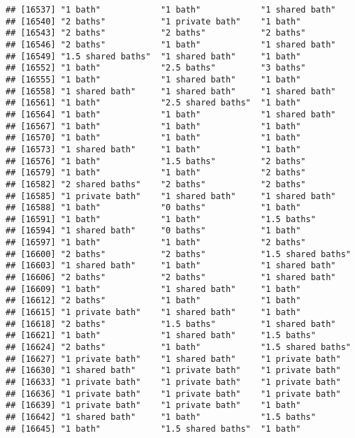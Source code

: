 \documentclass[
]{article}
\begin{document}
\begin{verbatim}
## [16537] "1 bath"            "1 bath"            "1 shared bath"    
## [16540] "2 baths"           "1 private bath"    "1 bath"           
## [16543] "2 baths"           "2 baths"           "2 baths"          
## [16546] "2 baths"           "1 bath"            "1 shared bath"    
## [16549] "1.5 shared baths"  "1 shared bath"     "1 bath"           
## [16552] "1 bath"            "2.5 baths"         "3 baths"          
## [16555] "1 bath"            "1 shared bath"     "1 bath"           
## [16558] "1 shared bath"     "1 shared bath"     "1 shared bath"    
## [16561] "1 bath"            "2.5 shared baths"  "1 bath"           
## [16564] "1 bath"            "1 bath"            "1 shared bath"    
## [16567] "1 bath"            "1 bath"            "1 bath"           
## [16570] "1 bath"            "1 bath"            "1 bath"           
## [16573] "1 shared bath"     "1 bath"            "1 bath"           
## [16576] "1 bath"            "1.5 baths"         "2 baths"          
## [16579] "1 bath"            "1 bath"            "2 baths"          
## [16582] "2 shared baths"    "2 baths"           "2 baths"          
## [16585] "1 private bath"    "1 shared bath"     "1 shared bath"    
## [16588] "1 bath"            "0 baths"           "1 bath"           
## [16591] "1 bath"            "1 bath"            "1.5 baths"        
## [16594] "1 shared bath"     "0 baths"           "1 bath"           
## [16597] "1 bath"            "1 bath"            "2 baths"          
## [16600] "2 baths"           "2 baths"           "1.5 shared baths" 
## [16603] "1 shared bath"     "1 bath"            "1 shared bath"    
## [16606] "2 baths"           "2 baths"           "1 shared bath"    
## [16609] "1 bath"            "1 shared bath"     "1 bath"           
## [16612] "2 baths"           "1 bath"            "1 bath"           
## [16615] "1 private bath"    "1 shared bath"     "1 bath"           
## [16618] "2 baths"           "1.5 baths"         "1 shared bath"    
## [16621] "1 bath"            "1 shared bath"     "1.5 baths"        
## [16624] "2 baths"           "1 bath"            "1.5 shared baths" 
## [16627] "1 private bath"    "1 shared bath"     "1 private bath"   
## [16630] "1 shared bath"     "1 private bath"    "1 private bath"   
## [16633] "1 private bath"    "1 private bath"    "1 private bath"   
## [16636] "1 private bath"    "1 private bath"    "1 private bath"   
## [16639] "1 private bath"    "1 private bath"    "1 bath"           
## [16642] "1 shared bath"     "1 bath"            "1.5 baths"        
## [16645] "1 bath"            "1.5 shared baths"  "1 bath"           

\end{verbatim}
\end{document}
